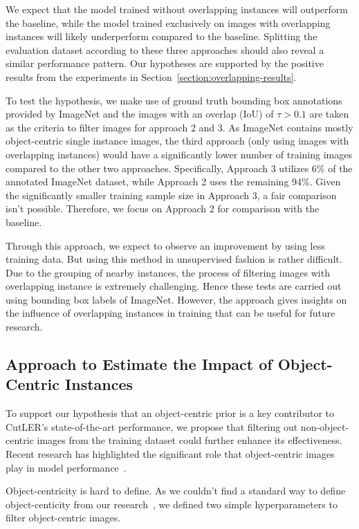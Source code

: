 We expect that the model trained without overlapping instances will outperform the baseline, while the model trained exclusively on images with overlapping instances will likely underperform compared to the baseline. Splitting the evaluation dataset according to these three approaches should also reveal a similar performance pattern. Our hypotheses are supported by the positive results from the experiments in Section~\ref{section:overlapping-results}.

To test the hypothesis, we make use of ground truth bounding box annotations provided by ImageNet and the images with an overlap (IoU) of \(\tau > \text{0.1}\) are taken as the criteria to filter images for approach 2 and 3. As ImageNet contains mostly object-centric single instance images, the third approach (only using images with overlapping instances) would have a significantly lower number of training images compared to the other two approaches. Specifically, Approach 3 utilizes 6\% of the annotated ImageNet dataset, while Approach 2 uses the remaining 94\%. Given the significantly smaller training sample size in Approach 3, a fair comparison isn't possible. Therefore, we focus on Approach 2 for comparison with the baseline.

Through this approach, we expect to observe an improvement by using less training data. But using this method in unsupervised fashion is rather difficult. Due to the grouping of nearby instances, the process of filtering images with overlapping instance is extremely challenging. Hence these tests are carried out using bounding box labels of ImageNet. However, the approach gives insights on the influence of overlapping instances in training that can be useful for future research.

\subsection{Approach to Estimate the Impact of Object-Centric Instances}
\label{section:analysis_oc_instancs}
To support our hypothesis that an object-centric prior is a key contributor to CutLER's state-of-the-art performance, we propose that filtering out non-object-centric images from the training dataset could further enhance its effectiveness. Recent research has highlighted the significant role that object-centric images play in model performance~\cite{engstler2023understanding, Gasparim_2021}.

Object-centricity is hard to define. As we couldn't find a standard way to define object-centicity from our research~\cite{Russakovsky, Gasparim_2021}, we defined two simple hyperparameters to filter object-centric images.

